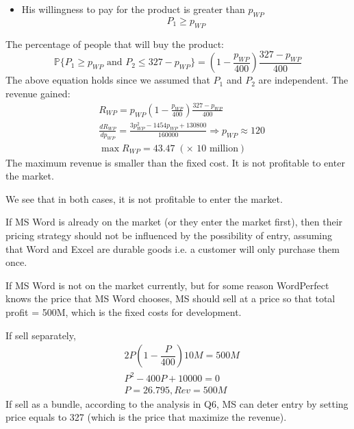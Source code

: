 \documentclass[a4paper]{article}
\begin{document}
\begin{answer}[Q6]
\begin{enumerate}
\begin{itemize}
        \item His willingness to pay for the product is greater than $p_{WP}$
        \begin{equation*}
            P_1 \geq p_{WP}
        \end{equation*}
    \end{itemize}
    The percentage of people that will buy the product:
    \begin{equation*}
        \mathbb{P}\{P_1 \geq p_{WP} \text{ and } P_2 \leq 327- p_{WP}\}
         = (1 - \frac{p_{WP}}{400}) \frac{327-p_{WP}}{400}
    \end{equation*}
    The above equation holds since we assumed that $P_1$ and $P_2$ are independent. The revenue gained:
    \begin{align*}
        &R_{WP} = p_{WP}(1 - \frac{p_{WP}}{400}) \frac{327-p_{WP}}{400} \\ 
        &\frac{dR_{WP}}{dp_{WP}} = \frac{3p_{WP}^2 - 1454 p_{WP} + 130800}{160000} \Rightarrow p_{WP} \approx 120 \\
        & \max R_{WP} = 43.47 \; (\times \text{ 10 million} )
    \end{align*}
    The maximum revenue is smaller than the fixed cost. It is not profitable to enter the market.
    \end{enumerate}
    We see that in both cases, it is not profitable to enter the market.
    \end{answer}
    
    \begin{answer}[Q7]
    If MS Word is already on the market (or they enter the market first), then their pricing strategy should not be influenced by the possibility of entry, assuming that Word and Excel are durable goods i.e. a customer will only purchase them once.
    
    If MS Word is not on the market currently, but for some reason WordPerfect knows the price that MS Word chooses, MS should sell at a price so that total profit = 500M, which is the fixed costs for development. 
    
    If sell separately,
    \begin{align*}
        &2P(1-\dfrac{P}{400})10M=500M \\
        &P^2-400P+10000=0 \\
        &P=26.795, Rev=500M \tag{another solution 373.025 is not feasible} %
    \end{align*}
    If sell as a bundle, according to the analysis in Q6, MS can deter entry by setting price equals to 327 (which is the price that maximize the revenue).
    \end{answer}
    
\end{document}
